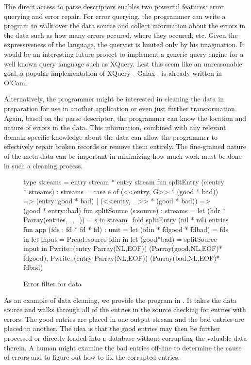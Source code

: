 The direct access to parse descriptors enables two powerful features:
error querying and error repair. For error querying, the programmer
can write a program to walk over the data source and collect
information about the errors in the data such as how many errors
occured, where they occured, etc. Given the expressiveness of the
language, the queryist is limited only by his imagination. It would be
an interesting future project to implement a generic query engine for
a well known query language such as XQuery. Lest this seem like an
unreasonable goal, a popular implementation of XQuery - Galax - is
already written in O'Caml.

Alternatively, the programmer might be interested in cleaning the data
in preparation for use in another application or even just further
transformation. Again, based on the parse descriptor, the programmer
can know the location and nature of errors in the data. This
information, combined with any relevant domain-specific knowledge
about the data can allow the programmer to effectively repair broken
records or remove them entirely. The fine-grained nature of the
meta-data can be important in minimizing how much work must be done in
such a cleaning process.

\begin{figure}
\begin{code}
type streams = entry stream * entry stream
\mbox{}
fun splitEntry (e:entry * streams) : streams =
  case e of
    (<<entry, G>> * (good * bad)) => (entry::good * bad)
  | (<<entry, _>> * (good * bad)) => (good * entry::bad)
\mbox{}    
fun splitSource (s:source) : streams =
    let (hdr * Parray(entries,_,_)) = s in 
    stream\_fold splitEntry (nil * nil) entries
\mbox{}
fun app (fds : fd * fd * fd) : unit =  
  let (fdin * fdgood * fdbad) = fds            in
  let input               = Pread::source fdin in
  let (good*bad)          = splitSource input  in
  Pwrite::(entry Parray(NL,EOF)) (Parray(good,NL,EOF)* fdgood);
  Pwrite::(entry Parray(NL,EOF)) (Parray(bad,NL,EOF)* fdbad)
\end{code}
\caption{Error filter for \dibbler{} data}
\label{fig:ex-data-clean}
\end{figure}

As an example of data cleaning, we provide the program in
. It takes the \dibbler{} data source and
walks through all of the entries in the source checking for entries
with errors.  The good entries are placed in one output stream and the
bad entries are placed in another.  The idea is that the good entries
may then be further processed or directly loaded into a database
without corrupting the valuable data therein.  A human might examine
the bad entries off-line to determine the cause of errors and to
figure out how to fix the corrupted entries.

